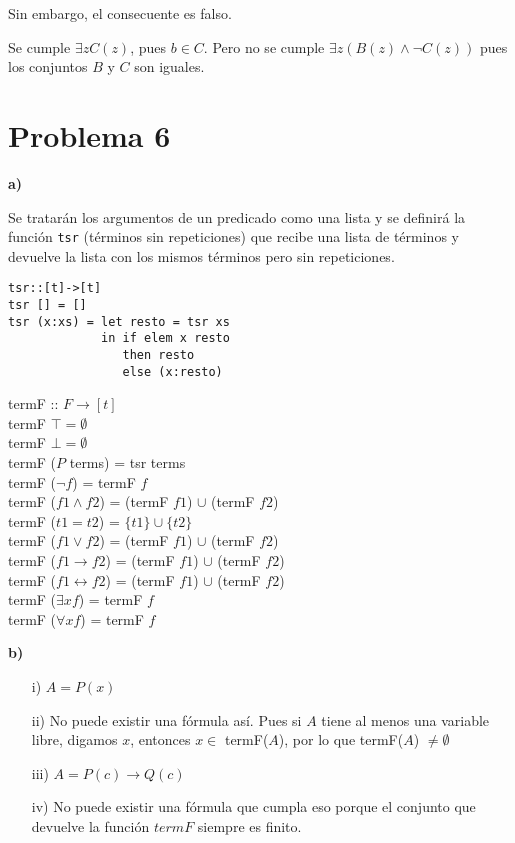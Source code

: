 \documentclass{article}
\begin{document}
Sin embargo, el consecuente es falso.

Se cumple $\exists z C(z)$, pues $b \in C$. Pero no se cumple $\exists z (B(z) \land \lnot C(z))$ pues los conjuntos $B$ y $C$ son iguales.

\section*{Problema 6}

\textbf{a)}

Se tratarán los argumentos de un predicado como una lista y se definirá la función \texttt{tsr} (términos sin repeticiones) que recibe una lista de términos y devuelve la lista con los mismos términos pero sin repeticiones.

\begin{verbatim}
tsr::[t]->[t]
tsr [] = []
tsr (x:xs) = let resto = tsr xs
             in if elem x resto
                then resto
                else (x:resto)
\end{verbatim}

termF :: $F \rightarrow [t]$\\
termF $\top = \emptyset$\\
termF $\bot = \emptyset$\\
termF ($P$ terms) = tsr terms\\
termF ($\lnot f$) = termF $f$\\
termF ($f1 \land f2$) = (termF $f1$) $\cup$ (termF $f2$)\\
termF ($t1 = t2$) = $\{t1\} \cup \{t2\}$\\
termF ($f1 \lor f2$) = (termF $f1$) $\cup$ (termF $f2$)\\
termF ($f1 \rightarrow f2$) = (termF $f1$) $\cup$ (termF $f2$)\\
termF ($f1 \leftrightarrow f2$) = (termF $f1$) $\cup$ (termF $f2$)\\
termF ($\exists x f$) = termF $f$\\
termF ($\forall x f$) = termF $f$

\textbf{b)}

\begin{itemize}
\item[i)] $A = P(x)$
\item[ii)] No puede existir una fórmula así. Pues si $A$ tiene al menos una variable libre, digamos $x$, entonces $x \in$ termF($A$), por lo que termF($A$) $\neq \emptyset$
\item[iii)] $A = P(c) \rightarrow Q(c)$
\item[iv)] No puede existir una fórmula que cumpla eso porque el conjunto que devuelve la función $termF$ siempre es finito.
\end{itemize}
\end{document}
